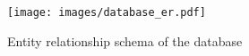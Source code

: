 \begin{figure}[ht]
	\centering
	\texttt{[image: images/database\_er.pdf]}
	\caption{Entity relationship schema of the database}
	\label{fig:er_schema}
\end{figure}
